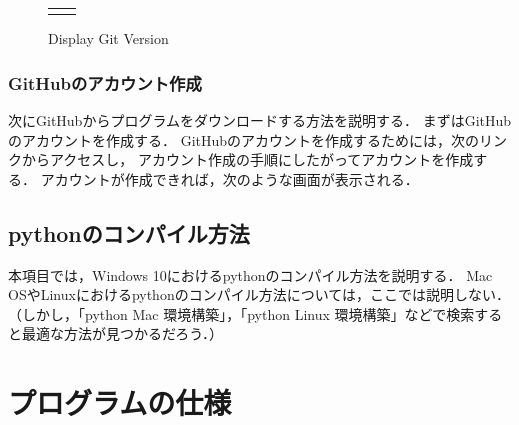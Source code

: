 \begin{figure}[h]
\begin{tabular}{cc}
\begin{minipage}{.5\textwidth}
          \caption{Display Git Version}
          \label{fig:git_version} %
      \end{minipage}
  \end{tabular}
\end{figure}

\subsubsection{GitHubのアカウント作成}
次にGitHubからプログラムをダウンロードする方法を説明する．
まずはGitHubのアカウントを作成する．
GitHubのアカウントを作成するためには，次のリンクからアクセスし，
アカウント作成の手順にしたがってアカウントを作成する．
アカウントが作成できれば，次のような画面が表示される．


\subsection{pythonのコンパイル方法}
本項目では，Windows 10におけるpythonのコンパイル方法を説明する．
Mac OSやLinuxにおけるpythonのコンパイル方法については，ここでは説明しない．
（しかし，「python Mac 環境構築」，「python Linux 環境構築」などで検索すると最適な方法が見つかるだろう．）

\section{プログラムの仕様}


